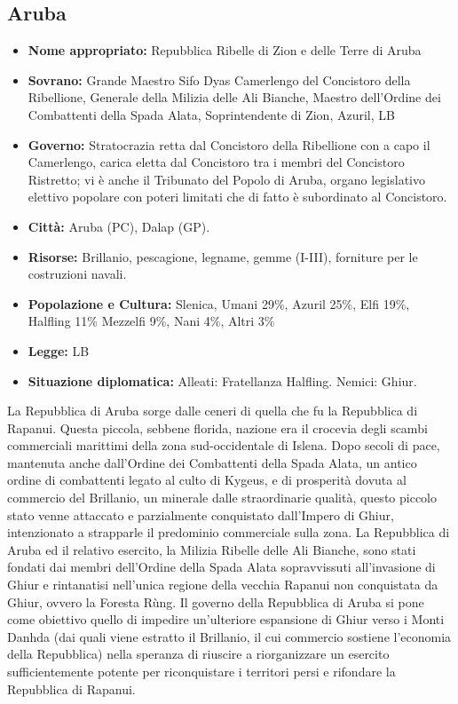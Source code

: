 \documentclass[10pt, a4paper]{report}
\begin{document}
\begin{multicols}{2}
\subsection*{Aruba}
\begin{itemize}
	\item \textbf{Nome appropriato:} Repubblica Ribelle di Zion e delle Terre di Aruba
	\item \textbf{Sovrano:} Grande Maestro Sifo Dyas Camerlengo del Concistoro della Ribellione, Generale della Milizia delle Ali Bianche, Maestro dell’Ordine dei Combattenti della Spada Alata, Soprintendente di Zion, Azuril, LB
	\item \textbf{Governo:} Stratocrazia retta dal Concistoro della Ribellione con a capo il Camerlengo, carica eletta dal Concistoro tra i membri del Concistoro Ristretto; vi è anche il Tribunato del Popolo di Aruba, organo legislativo elettivo popolare con poteri limitati che di fatto è subordinato al Concistoro.
	\item \textbf{Città:} Aruba (PC), Dalap (GP).
	\item \textbf{Risorse:} Brillanio, pescagione, legname, gemme (I-III), forniture per le costruzioni navali.
	\item \textbf{Popolazione e Cultura:} Slenica, Umani 29\%, Azuril 25\%, Elfi 19\%, Halfling 11\% Mezzelfi 9\%, Nani 4\%, Altri 3\%
	\item \textbf{Legge:} LB
	\item \textbf{Situazione diplomatica:} Alleati: Fratellanza Halfling.
	Nemici: Ghiur.
\end{itemize}
La Repubblica di Aruba sorge dalle ceneri di quella che fu la Repubblica di Rapanui. Questa piccola, sebbene florida, nazione era il crocevia degli scambi commerciali marittimi della zona sud-occidentale di Islena. Dopo secoli di pace, mantenuta anche dall’Ordine dei Combattenti della Spada Alata, un antico ordine di combattenti legato al culto di Kygeus, e di prosperità dovuta al commercio del Brillanio, un minerale dalle straordinarie qualità, questo piccolo stato venne attaccato e parzialmente conquistato dall’Impero di Ghiur, intenzionato a strapparle il predominio commerciale sulla zona. La Repubblica di Aruba ed il relativo esercito, la Milizia Ribelle delle Ali Bianche, sono stati fondati dai membri dell’Ordine della Spada Alata sopravvissuti all’invasione di Ghiur e rintanatisi nell’unica regione della vecchia Rapanui non conquistata da Ghiur, ovvero la Foresta Rùng.
Il governo della Repubblica di Aruba si pone come obiettivo quello di impedire un’ulteriore espansione di Ghiur verso i Monti Danhda (dai quali viene estratto il Brillanio, il cui commercio sostiene l’economia della Repubblica) nella speranza di riuscire a riorganizzare un esercito sufficientemente potente per riconquistare i territori persi e rifondare la Repubblica di Rapanui.



\end{multicols}
\end{document}
